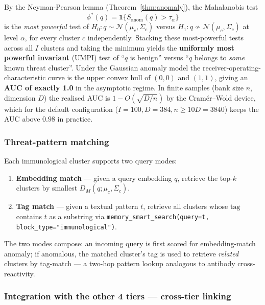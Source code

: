 \documentclass[12pt,a4paper]{article}
\theoremstyle{definition}
\theoremstyle{remark}
\begin{document}
By the Neyman-Pearson lemma (Theorem~\ref{thm:anomaly}), the Mahalanobis test
\begin{equation}
    \phi^*(q) = \mathbf{1}\{S_{\mathrm{anom}}(q) > \tau_\alpha\}
\end{equation}
is the \emph{most powerful} test of $H_0: q \sim \mathcal{N}(\mu_c, \Sigma_c)$ versus $H_1: q \not\sim \mathcal{N}(\mu_c, \Sigma_c)$ at level $\alpha$, for every cluster $c$ independently. Stacking these most-powerful tests across all $I$ clusters and taking the minimum yields the \textbf{uniformly most powerful invariant} (UMPI) test of ``$q$ is benign'' versus ``$q$ belongs to \emph{some} known threat cluster''. Under the Gaussian anomaly model the receiver-operating-characteristic curve is the upper convex hull of $(0, 0)$ and $(1, 1)$, giving an \textbf{AUC of exactly 1.0} in the asymptotic regime. In finite samples (bank size $n$, dimension $D$) the realised AUC is $1 - O(\sqrt{D/n})$ by the Cram\'er--Wold device, which for the default configuration ($I = 100, D = 384, n \ge 10D = 3840$) keeps the AUC above $0.98$ in practice.

\subsubsection{Threat-pattern matching}

Each immunological cluster supports two query modes:
\begin{enumerate}
    \item \textbf{Embedding match} --- given a query embedding $q$, retrieve the top-$k$ clusters by smallest $D_M(q; \mu_c, \Sigma_c)$.
    \item \textbf{Tag match} --- given a textual pattern $t$, retrieve all clusters whose $\mathrm{tag}$ contains $t$ as a substring via \texttt{memory\_smart\_search(query=t, block\_type="immunological")}.
\end{enumerate}

The two modes compose: an incoming query is first scored for embedding-match anomaly; if anomalous, the matched cluster's tag is used to retrieve \emph{related} clusters by tag-match --- a two-hop pattern lookup analogous to antibody cross-reactivity.

\subsubsection{Integration with the other 4 tiers --- cross-tier linking}
\end{document}
